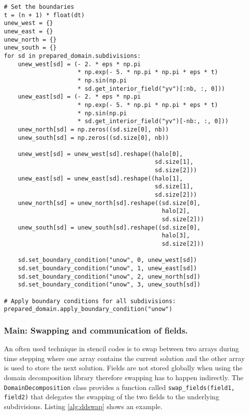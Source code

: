 \begin{lstlisting}[caption={Example code of handling the global boundary conditions.},captionpos=b, label={alg:ddbc}, float, floatplacement=H]
# Set the boundaries
t = (n + 1) * float(dt)
unew_west = {}
unew_east = {}
unew_north = {}
unew_south = {}
for sd in prepared_domain.subdivisions:
    unew_west[sd] = (- 2. * eps * np.pi 
                     * np.exp(- 5. * np.pi * np.pi * eps * t)
                     * np.sin(np.pi 
                     * sd.get_interior_field("yv")[:nb, :, 0]))
    unew_east[sd] = (- 2. * eps * np.pi 
                     * np.exp(- 5. * np.pi * np.pi * eps * t)
                     * np.sin(np.pi 
                     * sd.get_interior_field("yv")[-nb:, :, 0]))
    unew_north[sd] = np.zeros((sd.size[0], nb))
    unew_south[sd] = np.zeros((sd.size[0], nb))

    unew_west[sd] = unew_west[sd].reshape((halo[0], 
                                           sd.size[1],
                                           sd.size[2]))
    unew_east[sd] = unew_east[sd].reshape((halo[1],
                                           sd.size[1],
                                           sd.size[2]))
    unew_north[sd] = unew_north[sd].reshape((sd.size[0],
                                             halo[2],
                                             sd.size[2]))
    unew_south[sd] = unew_south[sd].reshape((sd.size[0],
                                             halo[3],
                                             sd.size[2]))

    sd.set_boundary_condition("unow", 0, unew_west[sd])
    sd.set_boundary_condition("unow", 1, unew_east[sd])
    sd.set_boundary_condition("unow", 2, unew_north[sd])
    sd.set_boundary_condition("unow", 3, unew_south[sd])

# Apply boundary conditions for all subdivisions:
prepared_domain.apply_boundary_condition("unow")
\end{lstlisting}

\subsubsection{Main: Swapping and communication of fields.}
An often used technique in stencil codes is to swap between two arrays during time stepping where one array contains the current solution and the other array is used to store the next solution.
Fields are not stored globally when using the domain decomposition library therefore swapping has to happen indirectly.
The \texttt{DomainDecomposition} class provides a function called \texttt{swap\_fields(field1, field2)} that delegates the swapping of the two fields to the underlying subdivisions.
Listing \ref{alg:ddswap} shows an example.

